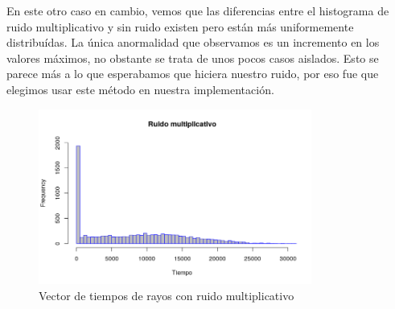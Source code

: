 \par En este otro caso en cambio, vemos que las diferencias entre el histograma de ruido multiplicativo y sin ruido existen pero están más uniformemente distribuídas. La única anormalidad que observamos es un incremento en los valores máximos, no obstante se trata de unos pocos casos aislados.
Esto se parece más a lo que esperabamos que hiciera nuestro ruido, por eso fue que elegimos usar este método en nuestra implementación.
\begin{figure}[H]
	\centering	\includegraphics[width=0.8\textwidth]{img/ruidoMultiplicativo.png}
	\caption{Vector de tiempos de rayos con ruido multiplicativo}
	\label{fig:etiqueta}
\end{figure}